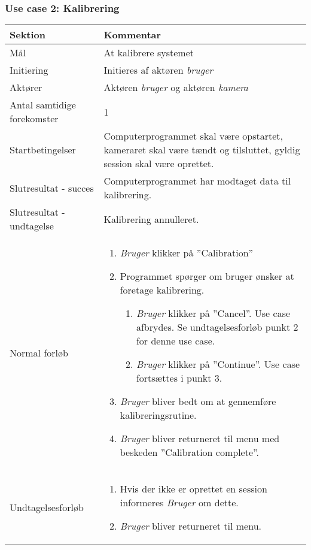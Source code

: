 \documentclass[kravspec.tex]{subfiles}
\begin{document}
	\subsubsection{Use case 2: Kalibrering}
	\begin{tabular}{|l|p{7.7cm}|}
		\hline \textbf{Sektion} & \textbf{Kommentar} \\ 
		\hline Mål & At kalibrere systemet \\ 
		\hline Initiering & Initieres af aktøren \textit{bruger} \\ 
		\hline Aktører & Aktøren \textit{bruger} og aktøren \textit{kamera} \\ 
		\hline Antal samtidige forekomster & 1 \\ 
		\hline Startbetingelser & Computerprogrammet skal være opstartet, kameraret skal være tændt og tilsluttet, gyldig session skal være oprettet. \\ 	
		\hline Slutresultat - succes & Computerprogrammet har modtaget data til kalibrering. \\ 
		\hline Slutresultat - undtagelse &  Kalibrering annulleret. \\ 
		\hline Normal forløb & \begin{enumerate}
			\item \textit{Bruger} klikker på ”Calibration”
			\item Programmet spørger om bruger ønsker at foretage kalibrering.
			\begin{enumerate}
				\item \textit{Bruger} klikker på ”Cancel”.
				Use case afbrydes.
				Se undtagelsesforløb punkt 2 for denne use case.
				\item \textit{Bruger} klikker på ”Continue”. 
				Use case fortsættes i punkt 3.
			\end{enumerate}
			\item \textit{Bruger} bliver bedt om at gennemføre kalibreringsrutine.
			\item \textit{Bruger} bliver returneret til menu med beskeden ”Calibration complete”.

		\end{enumerate} \\ 
		\hline Undtagelsesforløb & \begin{enumerate}
			\item Hvis der ikke er oprettet en session informeres \textit{Bruger} om dette.
			\item \textit{Bruger} bliver returneret til menu.
		\end{enumerate}  \\ 
		\hline 
	\end{tabular} \\ \\
	
\end{document}
